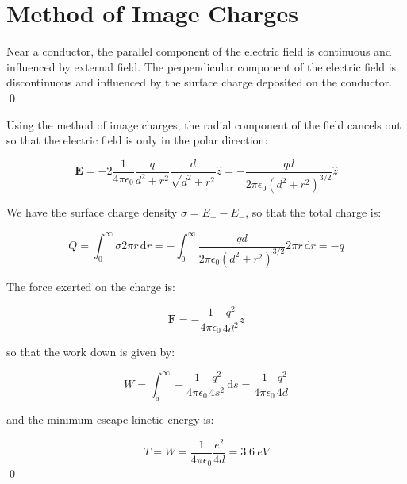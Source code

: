 \documentclass[12pt]{article}
\begin{document}



\pagebreak
\section*{Method of Image Charges}


Near a conductor, the parallel component of the electric field is continuous and influenced by external field. The perpendicular component of the electric field is discontinuous and influenced by the surface charge deposited on the conductor.
\qed



Using the method of image charges, the radial component of the field cancels out so that the electric field is only in the polar direction:

\begin{equation}
    \mathbf{E} = -2 \frac{1}{4\pi \epsilon_{0}} \frac{q}{d^{2} + r^{2}} \frac{d}{\sqrt{d^{2} + r^{2}}} \hat{z} = - \frac{qd}{2\pi \epsilon_{0} (d^{2} + r^{2})^{3/2}} \hat{z}
\end{equation}

We have the surface charge density $\sigma = E_{+} - E_{-}$, so that the total charge is:

\begin{equation}
    Q = \int_{0}^{\infty} \sigma 2\pi r \, \mathrm{d}r = -\int_{0}^{\infty} \frac{qd}{2\pi \epsilon_{0} (d^{2} + r^{2})^{3/2}} 2\pi r \, \mathrm{d}r = -q
\end{equation}

The force exerted on the charge is:

\begin{equation}
    \mathbf{F} = -\frac{1}{4\pi \epsilon_{0}} \frac{q^{2}}{4d^{2}} \hat{z}
\end{equation}

so that the work down is given by:

\begin{equation}
    W = \int_{d}^{\infty} -\frac{1}{4\pi \epsilon_{0}} \frac{q^{2}}{4s^{2}} \, \mathrm{d}s = \frac{1}{4\pi \epsilon_{0}} \frac{q^{2}}{4d}
\end{equation}

and the minimum escape kinetic energy is:

\begin{equation}
    T = W = \frac{1}{4\pi \epsilon_{0}} \frac{e^{2}}{4d} = \qty{3.6}{eV}
\end{equation}
\qed
\end{document}
